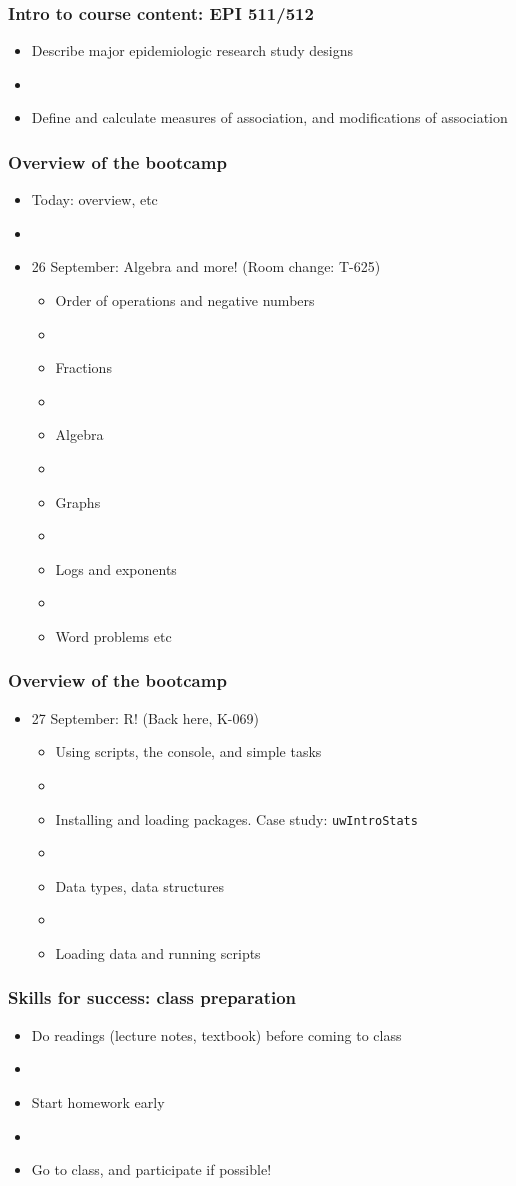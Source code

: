 \documentclass[12pt]{beamer}
\newcommand{\myframe}[1]{\begin{frame} \frametitle{#1}}
\begin{document}
\myframe{Intro to course content: EPI 511/512}
\begin{itemize}
\item Describe major epidemiologic research study designs
\item[]
\item Define and calculate measures of association, and modifications of association
\end{itemize}
\end{frame}
\myframe{Overview of the bootcamp}
\begin{itemize}
\item Today: overview, etc
\item[]
\item 26 September: Algebra and more! (Room change: T-625)
\begin{itemize}
\item Order of operations and negative numbers
\item[]
\item Fractions
\item[]
\item Algebra
\item[]
\item Graphs
\item[]
\item Logs and exponents
\item[]
\item Word problems etc
\end{itemize}
\end{itemize}
\end{frame}

\myframe{Overview of the bootcamp}
\begin{itemize}
\item 27 September: R! (Back here, K-069)
\begin{itemize}
\item Using scripts, the console, and simple tasks
\item[]
\item Installing and loading packages. Case study: \texttt{uwIntroStats}
\item[]
\item Data types, data structures
\item[]
\item Loading data and running scripts
\end{itemize}
\end{itemize}
\end{frame}

\myframe{Skills for success: class preparation}
\begin{itemize}
\item Do readings (lecture notes, textbook) before coming to class
\item[]
\item Start homework early
\item[]
\item Go to class, and participate if possible!
\end{itemize}
\end{frame}
\end{document}
